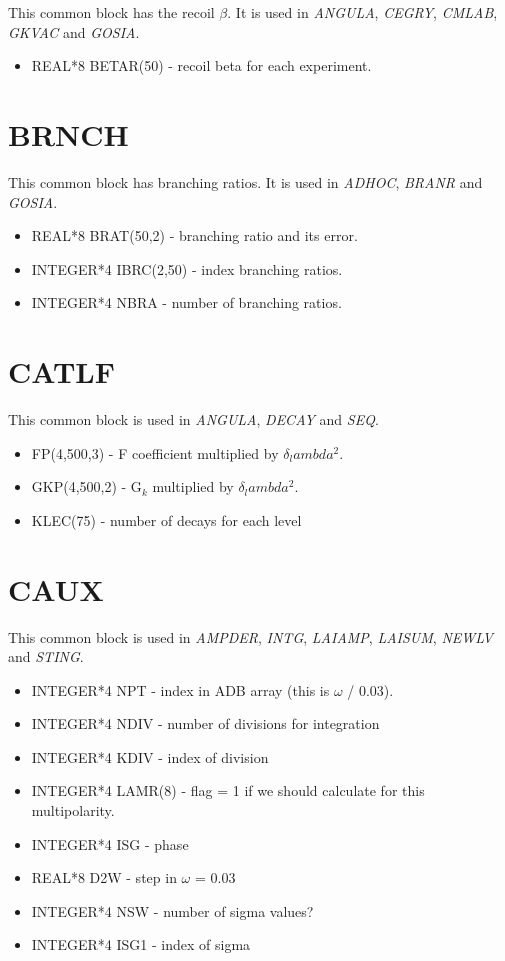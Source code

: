 This common block has the recoil $\beta$. It is used in {\em ANGULA}, {\em
CEGRY}, {\em CMLAB}, {\em GKVAC} and {\em GOSIA}.

\begin{itemize}
\item REAL*8 BETAR(50) - recoil beta for each experiment.
\end{itemize}

\section{BRNCH}

This common block has branching ratios. It is used in {\em ADHOC}, {\em
BRANR} and {\em GOSIA}.

\begin{itemize}
\item REAL*8 BRAT(50,2) - branching ratio and its error.
\item INTEGER*4 IBRC(2,50) - index branching ratios.
\item INTEGER*4 NBRA - number of branching ratios.
\end{itemize}

\section{CATLF}

This common block is used in {\em ANGULA}, {\em DECAY} and {\em SEQ}.

\begin{itemize}
\item FP(4,500,3) - F coefficient multiplied by $\delta_lambda^2$.
\item GKP(4,500,2) - G$_k$ multiplied by $\delta_lambda^2$.
\item KLEC(75) - number of decays for each level
\end{itemize}

\section{CAUX}

This common block is used in {\em AMPDER}, {\em INTG}, {\em LAIAMP}, {\em
LAISUM}, {\em NEWLV} and {\em STING}.

\begin{itemize}
\item INTEGER*4 NPT - index in ADB array (this is $\omega$ / 0.03).
\item INTEGER*4 NDIV - number of divisions for integration
\item INTEGER*4 KDIV - index of division
\item INTEGER*4 LAMR(8) - flag = 1 if we should calculate for this
multipolarity.
\item INTEGER*4 ISG - phase
\item REAL*8 D2W - step in $\omega$ = 0.03
\item INTEGER*4 NSW - number of sigma values?
\item INTEGER*4 ISG1 - index of sigma
\end{itemize}

